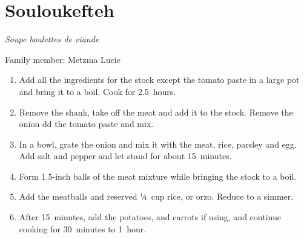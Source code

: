 \chapter{Souloukefteh}
\label{ch:souloukefteh}


\textit{Soupe boulettes de viande}

Family member: Metzma Lucie

\begin{enumerate}
    \item Add all the ingredients for the stock except the tomato paste in a large pot and bring it to a boil. Cook for 2.5~hours.
    \item Remove the shank, take off the meat and add it to the stock. Remove the onion dd the tomato paste and mix.
    \item In a bowl, grate the onion and mix it with the meat, rice, parsley and egg. Add salt and pepper and let stand for about 15~minutes.
    \item Form 1.5-inch balls of the meat mixture while bringing the stock to a boil.
    \item Add the meatballs and reserved ¼~cup rice, or orzo. Reduce to a simmer.
    \item After 15~minutes, add the potatoes, and carrots if using, and continue cooking for 30~minutes to 1~hour.
\end{enumerate}
